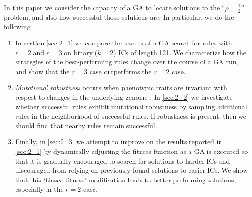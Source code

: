 In this paper we consider the capacity of a GA to locate solutions to the ``$\rho = \frac{1}{2}$'' problem, and also how successful those solutions are. In particular, we do the following: 
\begin{enumerate}
	\item In section \ref{sec:2_1} we compare the results of a GA search for rules 
	with $r = 2$ and $r = 3$ on binary ($k = 2$) 
	ICs of length 121. We characterize how the strategies of the best-performing rules change over the course of a GA run, 
	and show that the $r = 3$ case outperforms the $r = 2$ case.
	\item \textit{Mutational robustness} occurs when phenotypic traits are invariant with respect to changes in the underlying genome \cite{wagner_role_2012}.  
	In \ref{sec:2_2} we investigate whether successful rules exhibit mutational robustness by sampling additional rules in the neighborhood of successful rules. If robustness is present, then we should find that nearby rules remain successful.
	\item Finally, in \ref{sec:2_3} we attempt to improve on the results reported in \ref{sec:2_1} by dynamically adjusting the fitness function as a GA  
	is executed so that it is gradually encouraged to search for solutions to harder ICs and discouraged from relying on previously found 
	solutions to easier ICs. We show that this `biased fitness' 
	modification leads to better-preforming solutions, especially in the $r = 2$ case. 
\end{enumerate}








